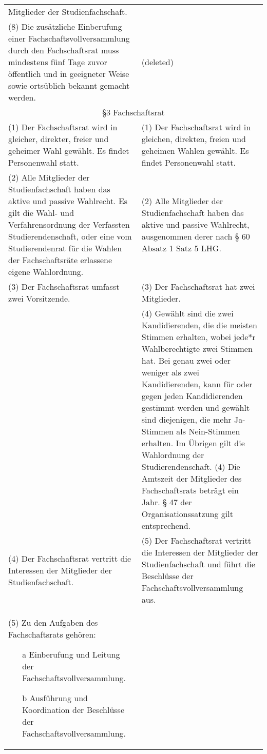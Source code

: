 {\begin{longtable}{|p{7.5cm}|p{7.5cm}|}
        Mitglieder der Studienfachschaft.\\
        (8) Die zusätzliche Einberufung einer Fachschaftsvollversammlung durch den Fachschaftsrat muss mindestens
        fünf Tage zuvor öffentlich und in geeigneter Weise sowie ortsüblich bekannt gemacht werden.
    &   (deleted)\\\hline
        \multicolumn{2}{|c|}{§3 Fachschaftsrat}\\\hline
        (1) Der Fachschaftsrat wird in gleicher, direkter, freier und geheimer Wahl gewählt.
        Es findet Personenwahl statt.&
        (1) Der Fachschaftsrat wird in gleichen, direkten, freien und geheimen Wahlen
        gewählt. Es findet Personenwahl statt.\\
        (2) Alle Mitglieder der Studienfachschaft haben das aktive und passive Wahlrecht. Es gilt
        die Wahl- und Verfahrensordnung der Verfassten Studierendenschaft, oder eine vom
        Studierendenrat für die Wahlen der Fachschaftsräte erlassene eigene Wahlordnung.&
        (2) Alle Mitglieder der Studienfachschaft haben das aktive und passive Wahlrecht,
        ausgenommen derer nach § 60 Absatz 1 Satz 5 LHG.\\
        (3) Der Fachschaftsrat umfasst zwei Vorsitzende.&
        (3) Der Fachschaftsrat hat zwei Mitglieder.\\
        &(4) Gewählt sind die zwei Kandidierenden, die die meisten Stimmen erhalten, wobei jede*r
        Wahlberechtigte zwei Stimmen hat. Bei genau zwei oder weniger als zwei Kandidierenden,
        kann für oder gegen jeden Kandidierenden gestimmt werden und gewählt sind diejenigen, die mehr
        Ja-Stimmen als Nein-Stimmen erhalten. Im Übrigen gilt die Wahlordnung der Studierendenschaft.\newline
        (4) Die Amtszeit der Mitglieder des Fachschaftsrats beträgt ein Jahr. § 47 der
        Organisationssatzung gilt entsprechend.\\
        (4) Der Fachschaftsrat vertritt die Interessen der Mitglieder der Studienfachschaft.&
        (5) Der Fachschaftsrat vertritt die Interessen der Mitglieder der Studienfachschaft und
        führt die Beschlüsse der Fachschaftsvollversammlung aus.\\  
        (5) Zu den Aufgaben des Fachschaftsrats gehören:
        \begin{enumerate}
            \item[a] Einberufung und Leitung der Fachschaftsvollversammlung.
            \item[b] Ausführung und Koordination der Beschlüsse der Fachschaftsvollversammlung.

\end{enumerate}
\end{longtable}}
